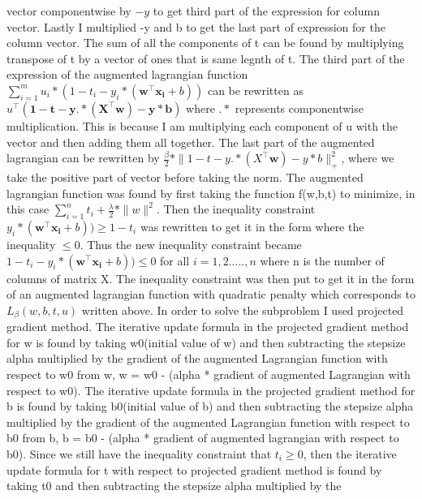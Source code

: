 \documentclass[11pt]{article}
\begin{document}
vector 
componentwise by 
$-y$ to get third part of the expression for column vector. Lastly I multiplied -y and b to get the last 
part of expression for the column vector. The sum of all the components of t can be found by multiplying 
transpose of t by a vector of ones that is same legnth of t. The third part of the expression of
the augmented lagrangian function $\sum\limits_{i=1}^m u_{i}*(1-t_{i}-y_{i}*\left(\mathbf{w}^\intercal 
\mathbf{x_{i}}+b \right))$ can be rewritten as $u^\intercal\left(\mathbf{1-t -y .* \left({X}^\intercal
\mathbf{w}\right)-y*b}\right)$ where $.*$ represents componentwise multiplication. This is because
I am multiplying each component of u with the vector and then adding them all together. The last part of 
the augmented lagrangian can be rewritten by $\frac{\beta}{2}* \|{1-t -y .* \left({X}^\intercal
\mathbf{w}\right)-y*b}\|_{+}^2$, where we take the positive part of vector before taking the norm.
The augmented lagrangian function was found by first taking the function f(w,b,t) to minimize, in this 
case
$\sum\limits_{i=1}^n  t_{i}+ \frac{\lambda}{2}*\| w\|^2$. Then the inequality constraint $y_{i}*
\left(\mathbf{w}^\intercal \mathbf{x_{i}}+b \right))\geq 1- t_{i}$ was rewritten to get it in
the form where the inequality $\leq 0$.  Thus the new inequality constraint became $1- t_{i}-y_{i}*
\left(\mathbf{w}^\intercal \mathbf{x_{i}}+b \right))\leq0$ for all $i = 1,2.....,n$ where n is the 
number 
of columns of matrix X. The inequality constraint was then put to get it in the form of an augmented 
lagrangian function with quadratic penalty which corresponds to $L_{\beta}\left(w,b,t,u \right)$ written 
above. In 
order to solve the subproblem I used 
projected 
gradient method. The iterative update formula in the projected gradient method for w is found by taking 
w0(initial value of w) and 
then 
subtracting the stepsize alpha multiplied by the gradient of the augmented Lagrangian function with 
respect 
to w0 from w, w = w0 - (alpha * gradient of augmented Lagrangian with respect to w0). The iterative 
update 
formula in the projected gradient method for b is found by taking b0(initial value of b) and then 
subtracting the stepsize alpha multiplied 
by the gradient of the augmented Lagrangian function with respect  to b0 from b, b = b0 - (alpha * 
gradient 
of augmented lagrangian with respect to b0). Since we still have the inequality constraint that $t_{i}
\geq0$, then the iterative update formula for t with respect to projected gradient method is found by 
taking t0 and then subtracting the 
stepsize alpha 
multiplied by the 
\end{document}

